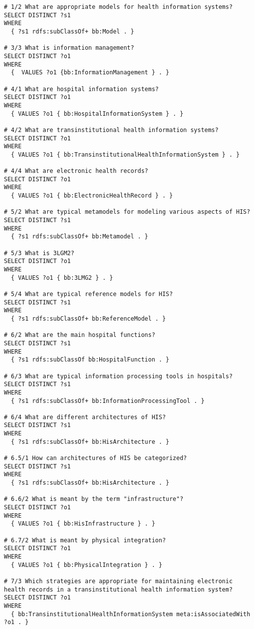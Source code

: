 \begin{lstlisting}[language=SPARQL]
# 1/2 What are appropriate models for health information systems?
SELECT DISTINCT ?s1
WHERE
  { ?s1 rdfs:subClassOf+ bb:Model . }

# 3/3 What is information management?
SELECT DISTINCT ?o1
WHERE
  {  VALUES ?o1 {bb:InformationManagement } . }

# 4/1 What are hospital information systems?
SELECT DISTINCT ?o1
WHERE
  { VALUES ?o1 { bb:HospitalInformationSystem } . }

# 4/2 What are transinstitutional health information systems?
SELECT DISTINCT ?o1
WHERE
  { VALUES ?o1 { bb:TransinstitutionalHealthInformationSystem } . }

# 4/4 What are electronic health records?
SELECT DISTINCT ?o1
WHERE
  { VALUES ?o1 { bb:ElectronicHealthRecord } . }

# 5/2 What are typical metamodels for modeling various aspects of HIS?
SELECT DISTINCT ?s1
WHERE
  { ?s1 rdfs:subClassOf+ bb:Metamodel . }

# 5/3 What is 3LGM2?
SELECT DISTINCT ?o1
WHERE
  { VALUES ?o1 { bb:3LMG2 } . }

# 5/4 What are typical reference models for HIS?
SELECT DISTINCT ?s1
WHERE
  { ?s1 rdfs:subClassOf+ bb:ReferenceModel . }

# 6/2 What are the main hospital functions?
SELECT DISTINCT ?s1
WHERE
  { ?s1 rdfs:subClassOf bb:HospitalFunction . }

# 6/3 What are typical information processing tools in hospitals?
SELECT DISTINCT ?s1
WHERE
  { ?s1 rdfs:subClassOf+ bb:InformationProcessingTool . }

# 6/4 What are different architectures of HIS?
SELECT DISTINCT ?s1
WHERE
  { ?s1 rdfs:subClassOf+ bb:HisArchitecture . }

# 6.5/1 How can architectures of HIS be categorized?
SELECT DISTINCT ?s1
WHERE
  { ?s1 rdfs:subClassOf+ bb:HisArchitecture . }

# 6.6/2 What is meant by the term "infrastructure"?
SELECT DISTINCT ?o1
WHERE
  { VALUES ?o1 { bb:HisInfrastructure } . }

# 6.7/2 What is meant by physical integration?
SELECT DISTINCT ?o1
WHERE
  { VALUES ?o1 { bb:PhysicalIntegration } . }

# 7/3 Which strategies are appropriate for maintaining electronic health records in a transinstitutional health information system?
SELECT DISTINCT ?o1
WHERE
  { bb:TransinstitutionalHealthInformationSystem meta:isAssociatedWith ?o1 . }


\end{lstlisting}
